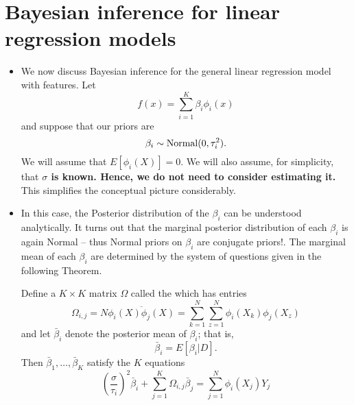 \section{Bayesian inference for linear regression models}
\begin{itemize}

\item  We now discuss Bayesian inference for the general linear regression model with features. Let
\begin{equation*}
f(x) = \sum_{i=1}^K\beta_i\phi_i(x)
\end{equation*}
and suppose that our priors are 
\begin{equation*}
\beta_i \sim {\rm Normal}(0,\tau_i^2).
\end{equation*}
We will assume that $E[\phi_i(X)]=0$. We will also assume, for simplicity, that {\bf $\sigma$ is known. Hence, we do not need to consider estimating it.} This simplifies the conceptual picture considerably. 

\item In this case, the Posterior distribution of the $\beta_i$ can be understood analytically. It turns out that the marginal posterior distribution of each $\beta_i$ is again Normal -- thus Normal priors on $\beta_i$ are conjugate priors!. The marginal mean of each $\beta_i$ are determined by the system of questions given in the following Theorem. 


\begin{thm}\label{thm:regpostmean}
Define a $K\times K$ matrix $\Omega$ called the  which has entries
\begin{equation*}
\Omega_{i,j} = N\overline{\phi_i(X)\phi_j(X)} = \sum_{k=1}^N\sum_{z=1}^N\phi_i(X_k)\phi_j(X_z) 
\end{equation*}
and let $\bar{\beta}_i$ denote the posterior mean of $\beta_i$; that is, 
\begin{equation*}
\bar{\beta}_i =  E[\beta_i|D]. 
\end{equation*}
Then $\bar{\beta}_1,\dots,\bar{\beta}_K$ satisfy the $K$ equations 
\begin{equation}\label{eq:barbeta}
 \left(\frac{\sigma}{\tau_i}\right)^{2}\bar{\beta}_i  +\sum_{j=1}^K\Omega_{i,j}\bar{\beta}_j = \sum_{j=1}^N\phi_i(X_j)Y_j
\end{equation}


\end{thm}
\end{itemize}
